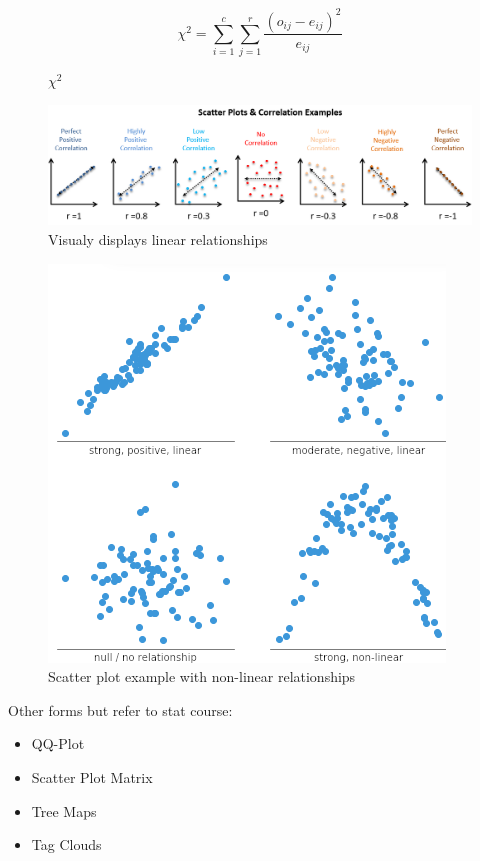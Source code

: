 \documentclass[../Main.tex]{subfiles}
\begin{document}
\begin{figure}[H]
    \begin{equation}
        \chi^2 = \sum_{i=1}^{c} \sum_{j=1}^{r} \frac{ (o_{ij} - e_{ij})^2 }{ e_{ij}}
    \end{equation}
    \caption{\(\chi^2\)}
\end{figure}

\begin{figure}[H]
    \centering
    \includegraphics[width=0.75\linewidth]{Images/datan/scatter-plot.png}
    \caption{Visualy displays linear relationships}
\end{figure}

\begin{figure}[H]
    \centering
    \includegraphics[width=0.75\linewidth]{Images/datan/scatter-plot2.png}
    \caption{Scatter plot example with non-linear relationships}
\end{figure}
Other forms but refer to stat course:
\begin{itemize}
    \item QQ-Plot
    \item Scatter Plot Matrix
    \item Tree Maps
    \item Tag Clouds
\end{itemize}
\end{document}
